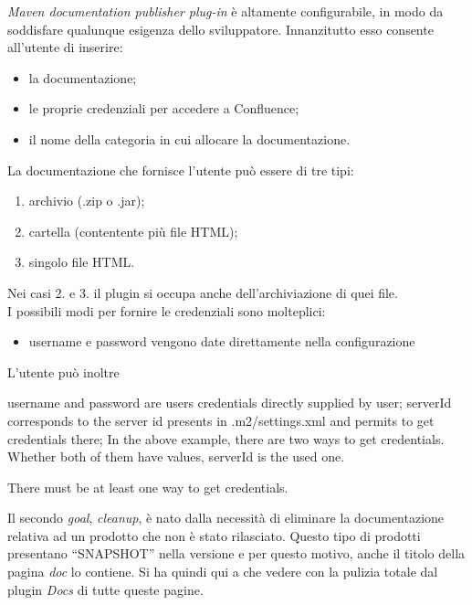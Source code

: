 \emph{Maven documentation publisher plug-in} è altamente configurabile, in modo da soddisfare qualunque esigenza dello sviluppatore.
Innanzitutto esso consente all'utente di inserire:
\begin{itemize}
	\item la documentazione;
	\item le proprie credenziali per accedere a Confluence;	
	\item il nome della categoria in cui allocare la documentazione.
\end{itemize}
La documentazione che fornisce l'utente può essere di tre tipi:
\begin{enumerate}
	\item archivio (.zip o .jar);
	\item cartella (contentente più file HTML);
	\item singolo file HTML.
\end{enumerate}
Nei casi 2. e 3. il plugin si occupa anche dell'archiviazione di quei file. \\

I possibili modi per fornire le credenziali sono molteplici:
\begin{itemize}
	\item username e password vengono date direttamente nella configurazione
\end{itemize}
L'utente può inoltre 



username and password are users credentials directly supplied by user;
serverId corresponds to the server id presents in .m2/settings.xml and permits to get credentials there;
In the above example, there are two ways to get credentials. Whether both of them have values, serverId is the used one.

There must be at least one way to get credentials.







Il secondo \emph{goal}, \emph{cleanup}, è nato dalla necessità di eliminare la documentazione relativa ad un prodotto che non è stato rilasciato.
Questo tipo di prodotti presentano ``SNAPSHOT'' nella versione e per questo motivo, anche il titolo della pagina \emph{doc} lo contiene.
Si ha quindi qui a che vedere con la pulizia totale dal plugin \emph{Docs} di tutte queste pagine.


